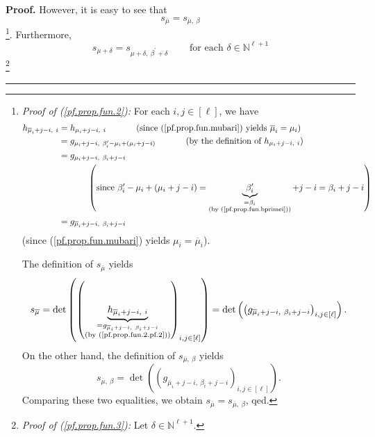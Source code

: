 \documentclass
[numbers=enddot,12pt,final,onecolumn,notitlepage,english]{scrartcl}%
\theoremstyle{definition}
\newenvironment{proof}[1][Proof]{\noindent\textbf{#1.} }{\ \rule{0.5em}{0.5em}}
\newenvironment{verlong}{}{}
\begin{document}
\begin{verlong}
\begin{proof}
However, it is easy to see that%
\begin{equation}
s_{\overline{\mu}}=s_{\overline{\mu},\ \beta} \label{pf.prop.fun.2}%
\end{equation}
\footnote{\textit{Proof of (\ref{pf.prop.fun.2}):} For each $i,j\in\left[
\ell\right]  $, we have%
\begin{align}
h_{\overline{\mu}_{i}+j-i,\ i}  &  =h_{\mu_{i}+j-i,\ i}%
\ \ \ \ \ \ \ \ \ \ \left(  \text{since (\ref{pf.prop.fun.mubari}) yields
}\overline{\mu}_{i}=\mu_{i}\right) \nonumber\\
&  =g_{\mu_{i}+j-i,\ \beta_{i}^{\prime}-\mu_{i}+\left(  \mu_{i}+j-i\right)
}\ \ \ \ \ \ \ \ \ \ \left(  \text{by the definition of }h_{\mu_{i}%
+j-i,\ i}\right) \nonumber\\
&  =g_{\mu_{i}+j-i,\ \beta_{i}+j-i}\nonumber\\
&  \ \ \ \ \ \ \ \ \ \ \left(  \text{since }\beta_{i}^{\prime}-\mu_{i}+\left(
\mu_{i}+j-i\right)  =\underbrace{\beta_{i}^{\prime}}_{\substack{=\beta
_{i}\\\text{(by (\ref{pf.prop.fun.bprimei}))}}}+j-i=\beta_{i}+j-i\right)
\nonumber\\
&  =g_{\overline{\mu}_{i}+j-i,\ \beta_{i}+j-i} \label{pf.prop.fun.2.pf.2}%
\end{align}
(since (\ref{pf.prop.fun.mubari}) yields $\mu_{i}=\overline{\mu}_{i}$).
\par
The definition of $s_{\overline{\mu}}$ yields%
\[
s_{\overline{\mu}}=\det\left(  \left(  \underbrace{h_{\overline{\mu}%
_{i}+j-i,\ i}}_{\substack{=g_{\overline{\mu}_{i}+j-i,\ \beta_{i}%
+j-i}\\\text{(by (\ref{pf.prop.fun.2.pf.2}))}}}\right)  _{i,j\in\left[
\ell\right]  }\right)  =\det\left(  \left(  g_{\overline{\mu}_{i}%
+j-i,\ \beta_{i}+j-i}\right)  _{i,j\in\left[  \ell\right]  }\right)  .
\]
On the other hand, the definition of $s_{\overline{\mu},\ \beta}$ yields%
\[
s_{\overline{\mu},\ \beta}=\det\left(  \left(  g_{\overline{\mu}%
_{i}+j-i,\ \beta_{i}+j-i}\right)  _{i,j\in\left[  \ell\right]  }\right)  .
\]
Comparing these two equalities, we obtain $s_{\overline{\mu}}=s_{\overline
{\mu},\ \beta}$, qed.}. Furthermore,
\begin{equation}
s_{\mu+\delta}=s_{\mu+\delta,\ \beta^{\prime}+\delta}%
\ \ \ \ \ \ \ \ \ \ \text{for each }\delta\in\mathbb{N}^{\ell+1}
\label{pf.prop.fun.3}%
\end{equation}
\footnote{\textit{Proof of (\ref{pf.prop.fun.3}):} Let $\delta\in
\mathbb{N}^{\ell+1}$.
\par
}
\end{proof}
\end{verlong}
\end{document}
